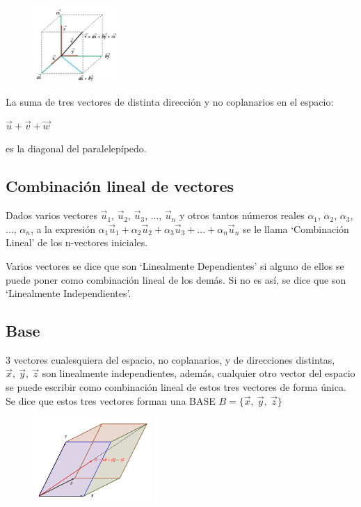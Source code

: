 \begin{multicols}{2}
	\begin{figure}[H]
	\centering
	\includegraphics[width=0.30\textwidth]{imagenes/imagenes10/T10IM04.png}
	\end{figure}
	
	La suma de tres vectores de distinta dirección y no coplanarios en el espacio: 
	
	\centerline{$\vec u+\vec v+\vec w$} 
	
	es la diagonal del paralelepípedo.
\end{multicols}

\subsection{Combinación lineal de vectores}

	Dados varios vectores $\vec u_1$, $\vec u_2$, $\vec u_3$, ..., $\vec u_n$ y otros tantos números reales $\alpha_1$, $\alpha_2$, $\alpha_3$, ..., $\alpha_n$, a la expresión $\alpha_1 \vec u_1+\alpha_2 \vec u_2+\alpha_3 \vec u_3+...+\alpha_n \vec u_n$ se le llama `Combinación Lineal' de los n-vectores iniciales.
		
		
	Varios vectores se dice que son `Linealmente Dependientes'  si alguno de ellos se puede poner como combinación lineal de los demás. Si no es así, se dice que son `Linealmente Independientes'.
	

\subsection{Base}

\begin{multicols}{2}
	3 vectores cualesquiera del espacio, no coplanarios, y de direcciones distintas, $\vec x,\ \vec y, \ \vec z$ son linealmente independientes, además, cualquier otro vector del espacio se puede escribir como combinación lineal de estos tres vectores de forma única. Se dice que estos tres vectores forman una BASE $B=\{\vec x,\ \vec y, \ \vec z\}$
	\begin{figure}[H]
	\centering
	\includegraphics[width=0.40\textwidth]{imagenes/imagenes10/T10IM06.png}
	\end{figure}
\end{multicols}

